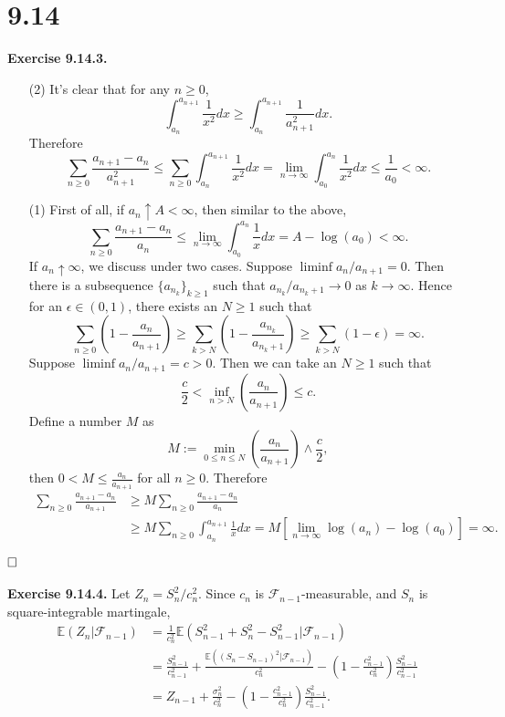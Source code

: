 \documentclass[12pt]{extarticle}
\begin{document}
\newpage
\section*{9.14}
\textbf{Exercise 9.14.3.}
\begin{enumerate}
\item[(2)] It's clear that for any $n\geq 0$,
\[
\int_{a_n}^{a_{n+1}}\frac{1}{x^2}dx\geq \int_{a_n}^{a_{n+1}}\frac{1}{a_{n+1}^2}dx.
\]
Therefore
\[
\sum_{n\geq 0}\frac{a_{n+1}-a_n}{a_{n+1}^2}
\leq
\sum_{n\geq 0}
\int_{a_n}^{a_{n+1}}\frac{1}{x^2}dx
=\lim_{n\rightarrow\infty}
\int_{a_0}^{a_n}\frac{1}{x^2}dx
\leq\frac{1}{a_0}<\infty.
\]

\item[(1)]
First of all, if $a_n\uparrow A<\infty$, then similar to the above,
\[
\sum_{n\geq 0}\frac{a_{n+1}-a
_n}{a_n}\leq\lim_{n\rightarrow\infty}\int_{a_0}^{a_n}\frac{1}{x}dx
=
A-\log(a_0)<\infty.
\]
If $a_n\uparrow \infty$, we discuss under two cases.
Suppose $\liminf a_n/a_{n+1}=0$. Then there is a subsequence $\{a_{n_k}\}_{k\geq 1}$ such that $a_{n_k} / a_{n_k+1}\rightarrow 0$ as $k\rightarrow\infty$. Hence for an $\epsilon\in(0,1)$, there exists an $N\geq 1$ such that
\[
\sum_{n\geq 0}\left(1-\frac{a_{n}}{a_{n+1}}\right)\geq \sum_{k>N}\left(1-\frac{a_{n_k}}{a_{n_k+1}}\right)\geq
\sum_{k>N}\left(1-\epsilon\right)=\infty.
\]
Suppose $\liminf a_n/a_{n+1}=c>0$. Then we can take an $N\geq 1$ such that
\[
\frac{c}{2}<\inf_{n>N}\left(\frac{a_{n}}{a_{n+1}}\right)\leq c.
\]
Define a number $M$ as
\[
M:=\min_{0\leq n\leq N}\left(\frac{a_n}{a_{n+1}}\right)\wedge\frac{c}{2},
\]
then $0<M\leq\frac{a_n}{a_{n+1}}$ for all $n\geq 0$. Therefore
\[
\begin{aligned}
\sum_{n\geq 0}\frac{a_{n+1}-a_n}{a_{n+1}}
&\geq
M\sum_{n\geq 0}\frac{a_{n+1}-a_n}{a_n}
\\&\geq
M\sum_{n\geq 0}\int_{a_n}^{a_{n+1}}\frac{1}{x}dx
=M\left[\lim_{n\rightarrow\infty}\log(a_n)-\log(a_0)\right]=\infty.
\end{aligned}
\]
\end{enumerate}
$\hspace{\fill}\square$
\\
\\
\textbf{Exercise 9.14.4.} Let $Z_n=S_n^2/c_n^2$. Since $c_n$ is $\mathcal{F}_{n-1}$-measurable, and $S_n$ is square-integrable martingale,
\[
\begin{aligned}
\mathbb{E}(Z_n|\mathcal{F}_{n-1})
&=
\frac{1}{c_n^2}\mathbb{E}\left(S_{n-1}^2+S_n^2-S_{n-1}^2|\mathcal{F}_{n-1}\right)
\\&=
\frac{S_{n-1}^2}{c_{n-1}^2}+\frac{\mathbb{E}\left((S_n-S_{n-1})^2|\mathcal{F}_{n-1}\right)}{c_n^2}
-\left(1-\frac{c_{n-1}^2}{c_n^2}\right)\frac{S_{n-1}^2}{c_{n-1}^2}
\\&
=Z_{n-1}+\frac{\sigma^2_n}{c_n^2}-\left(1-\frac{c_{n-1}^2}{c_n^2}\right)\frac{S_{n-1}^2}{c_{n-1}^2}.
\end{aligned}
\]
\end{document}
